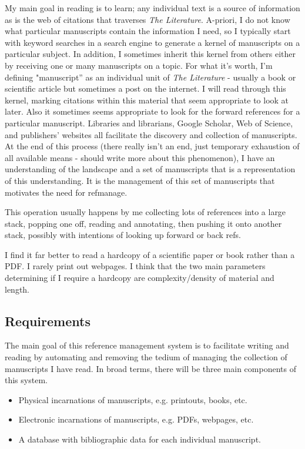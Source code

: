 \documentclass[letterpaper,12pt]{article}
\begin{document}
My main goal in reading is to learn; any individual text is a source of information as is the web of citations that traverses \emph{The Literature}. A-priori, I do not know what particular manuscripts contain the information I need, so I typically start with keyword searches in a search engine to generate a kernel of manuscripts on a particular subject. In addition, I sometimes inherit this kernel from others either by receiving one or many manuscripts on a topic. For what it's worth, I'm defining "manuscript'' as an individual unit of \emph{The Literature}  - usually a book or scientific article but sometimes a post on the internet. I will read through this kernel, marking citations within this material that seem appropriate to look at later. Also it sometimes seems appropriate to look for the forward references for a particular manuscript. Libraries and librarians, Google Scholar, Web of Science, and publishers' websites all facilitate the discovery and collection of manuscripts. At the end of this process (there really isn't an end, just temporary exhaustion of all available means - should write more about this phenomenon), I have an understanding of the landscape and a set of manuscripts that is a representation of this understanding. It is the management of this set of manuscripts that motivates the need for refmanage.

This operation usually happens by me collecting lots of references into a large stack, popping one off, reading and annotating, then pushing it onto another stack, possibly with intentions of looking up forward or back refs.

I find it far better to read a hardcopy of a scientific paper or book rather than a PDF. I rarely print out webpages. I think that the two main parameters determining if I require a hardcopy are complexity/density of material and length.








\subsection{Requirements}
The main goal of this reference management system is to facilitate writing and reading by automating and removing the tedium of managing the collection of manuscripts I have read. In broad terms, there will be three main components of this system.

\begin{itemize}
\item Physical incarnations of manuscripts, e.g. printouts, books, etc.
\item Electronic incarnations of manuscripts, e.g. PDFs, webpages, etc.
\item A database with bibliographic data for each individual manuscript.
\end{itemize}
\end{document}
